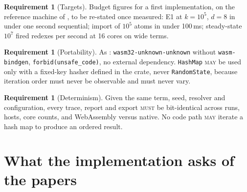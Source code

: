 \documentclass[11pt,a4paper]{article}
\newcommand{\code}[1]{\texttt{#1}}
\newcommand{\MUST}{\textsc{must}}
\newcommand{\MAY}{\textsc{may}}
\theoremstyle{definition}
\newtheorem{requirement}[definition]{Requirement}
\theoremstyle{plain}
\begin{document}
\begin{requirement}[Targets]\label{req:targets}
Budget figures for a first implementation, on the reference machine of
\cite[\S11]{k1ndl1ng}, to be re-stated once measured: E1 at $k = 10^{5}$,
$d = 8$ in under one second sequential; import of $10^{5}$ atoms in under
100\,ms; steady-state $10^{7}$ fired redexes per second at 16 cores on
wide terms.
\end{requirement}

\begin{requirement}[Portability]\label{req:port}
As \cite[Req.~12.3]{combspec}: \code{wasm32-unknown-unknown} without
\code{wasm-bindgen}, \code{forbid(unsafe\_code)}, no external dependency.
\code{HashMap} \MAY{} be used only with a fixed-key hasher defined in the
crate, never \code{RandomState}, because iteration order must never be
observable and must never vary.
\end{requirement}

\begin{requirement}[Determinism]\label{req:det}
Given the same term, seed, resolver and configuration, every trace, report
and export \MUST{} be bit-identical across runs, hosts, core counts, and
WebAssembly versus native. No code path \MAY{} iterate a hash map to produce
an ordered result.
\end{requirement}

\section{What the implementation asks of the papers}\label{sec:paper}
\end{document}
